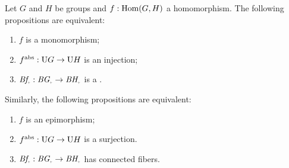 \begin{lemma}\label{lem:eq-mono-cover}
Let $G$ and $H$ be groups and $f: \Hom(G,H)$ a homomorphism.
The following propositions are equivalent:\label{lem:eq-epi-conn} %
\begin{enumerate}
\item\label{it:mono} $f$ is a monomorphism;
\item\label{it:injection} $f^{\mathrm{abs}}:\mathrm{U} G\to\mathrm{U} H$ is an injection;
\item\label{it:cover} $\Bf_\div:\BG_\div\to \BH_\div$ is a \covering.
\end{enumerate}

Similarly, the following propositions are equivalent:
\begin{enumerate}[label=(\arabic*')]
\item\label{it:epi} $f$ is an epimorphism;
\item\label{it:surjection} $f^{\mathrm{abs}}:\mathrm{U} G\to\mathrm{U} H$ is a surjection.
\item\label{it:connfib} $\Bf_\div:\BG_\div\to \BH_\div$ has connected fibers.
\end{enumerate}
\end{lemma}
